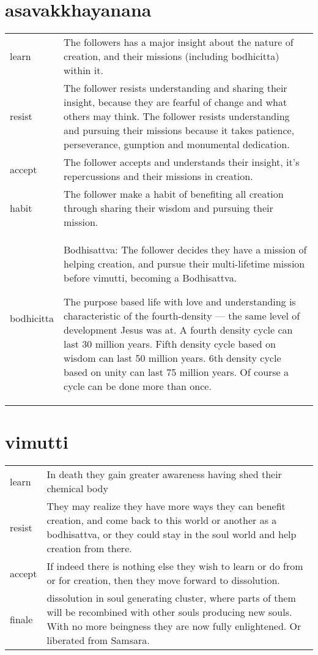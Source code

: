 \chapter{asavakkhayanana}\label{chapter11}
\begin{tabular}{lp{}}
learn & The followers has a major insight about the nature of creation,
and their missions (including bodhicitta) within it.\\
resist & The follower resists understanding and sharing their insight,
because they are fearful of change and what others may think. The follower
resists understanding and pursuing their missions because it takes patience,
perseverance, gumption and monumental dedication.\\
accept & The follower accepts and understands their insight, it's
repercussions and their missions in creation.\\
habit & The follower make a habit of benefiting all creation through
sharing their wisdom and pursuing their mission.\\
bodhicitta & Bodhisattva: The follower decides they have a mission of helping creation, 
and pursue their multi-lifetime mission before vimutti, becoming a
Bodhisattva.

The purpose based life with love and understanding is characteristic of the
  fourth-density --- the same level of development Jesus was at. A fourth 
  density cycle can last 30 million years. Fifth density cycle based on
  wisdom can last 50 million years. 6th density cycle based on unity can last 75
  million years. Of course a cycle can be done more than once. 
  \\

\end{tabular}



\chapter{vimutti}

\begin{tabular}{lp{}}
learn & In death they gain greater awareness having shed their chemical
body\\
resist & They may realize they have more ways they can benefit
creation, and come back to this world or another as a bodhisattva, or they could
stay in the soul world and help creation from there. 
  \\
accept & If indeed there is nothing else they wish to learn or do
from or for creation, then they move forward to dissolution.\\
finale & dissolution in soul generating cluster, where parts of them 
will be recombined with other souls producing new souls. 
With no more beingness they are now fully
enlightened. Or liberated from Samsara.\\
\end{tabular}

